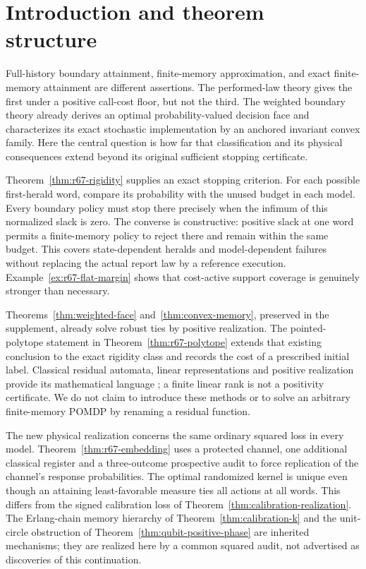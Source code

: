 \section{Introduction and theorem structure}\label{sec:current-overview}\label{sec:introduction}
Full-history boundary attainment, finite-memory approximation, and exact finite-memory attainment are different assertions. The performed-law theory gives the first under a positive call-cost floor, but not the third. The weighted boundary theory already derives an optimal probability-valued decision face and characterizes its exact stochastic implementation by an anchored invariant convex family. Here the central question is how far that classification and its physical consequences extend beyond its original sufficient stopping certificate.

Theorem~\ref{thm:r67-rigidity} supplies an exact stopping criterion. For each possible first-herald word, compare its probability with the unused budget in each model. Every boundary policy must stop there precisely when the infimum of this normalized slack is zero. The converse is constructive: positive slack at one word permits a finite-memory policy to reject there and remain within the same budget. This covers state-dependent heralds and model-dependent failures without replacing the actual report law by a reference execution. Example~\ref{ex:r67-flat-margin} shows that cost-active support coverage is genuinely stronger than necessary.

Theorems~\ref{thm:weighted-face} and~\ref{thm:convex-memory}, preserved in the supplement, already solve robust ties by positive realization. The pointed-polytope statement in Theorem~\ref{thm:r67-polytope} extends that existing conclusion to the exact rigidity class and records the cost of a prescribed initial label. Classical residual automata, linear representations and positive realization provide its mathematical language \cite{RabinScott59,Jaeger00,ThonJaeger15,MonrasWinter14}; a finite linear rank is not a positivity certificate. We do not claim to introduce these methods or to solve an arbitrary finite-memory POMDP by renaming a residual function.

The new physical realization concerns the same ordinary squared loss in every model. Theorem~\ref{thm:r67-embedding} uses a protected channel, one additional classical register and a three-outcome prospective audit to force replication of the channel's response probabilities. The optimal randomized kernel is unique even though an attaining least-favorable measure ties all actions at all words. This differs from the signed calibration loss of Theorem~\ref{thm:calibration-realization}. The Erlang-chain memory hierarchy of Theorem~\ref{thm:calibration-k} and the unit-circle obstruction of Theorem~\ref{thm:qubit-positive-phase} are inherited mechanisms; they are realized here by a common squared audit, not advertised as discoveries of this continuation.

